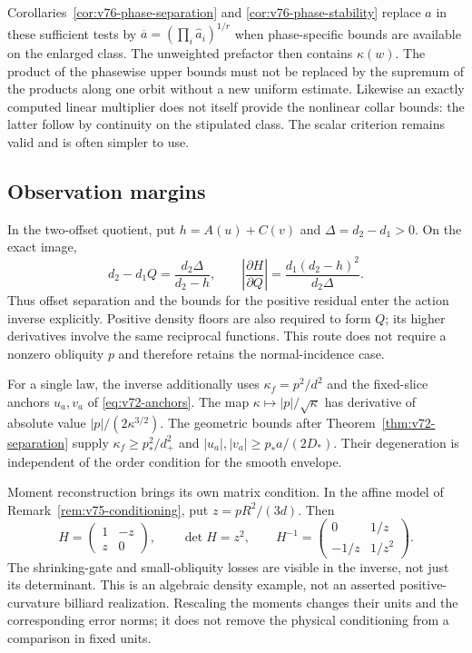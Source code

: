 Corollaries~\ref{cor:v76-phase-separation} and
\ref{cor:v76-phase-stability} replace $a$ in these sufficient tests by
$\overline a=(\prod_i\widehat a_i)^{1/r}$ when phase-specific bounds
are available on the enlarged class.  The unweighted prefactor then
contains $\kappa(w)$.  The product of the phasewise upper bounds must
not be replaced by the supremum of the products along one orbit without
a new uniform estimate.  Likewise an exactly computed linear multiplier
does not itself provide the nonlinear collar bounds: the latter follow
by continuity on the stipulated class.  The scalar criterion remains
valid and is often simpler to use.

\subsection{Observation margins}

In the two-offset quotient, put $h=A(u)+C(v)$ and
$\Delta=d_2-d_1>0$.  On the exact image,
\[
 d_2-d_1Q=\frac{d_2\Delta}{d_2-h},\qquad
 \left|\frac{\partial H}{\partial Q}\right|
        =\frac{d_1(d_2-h)^2}{d_2\Delta}.
\]
Thus offset separation and the bounds for the positive residual enter
the action inverse explicitly.  Positive density floors are also
required to form $Q$; its higher derivatives involve the same reciprocal
functions.  This route does not require a nonzero obliquity $p$ and
therefore retains the normal-incidence case.

For a single law, the inverse additionally uses
$\kappa_f=p^2/d^2$ and the fixed-slice anchors $u_a,v_a$ of
\eqref{eq:v72-anchors}.  The map $\kappa\mapsto|p|/\sqrt\kappa$
has derivative of absolute value $|p|/(2\kappa^{3/2})$.
The geometric bounds after Theorem~\ref{thm:v72-separation} supply
$\kappa_f\ge p_*^2/d_+^2$ and
$|u_a|,|v_a|\ge p_*a/(2D_*)$.  Their degeneration is independent
of the order condition for the smooth envelope.

Moment reconstruction brings its own matrix condition.  In the affine
model of Remark~\ref{rem:v75-conditioning}, put
$z=pR^2/(3d)$.  Then
\[
 H=\begin{pmatrix}1&-z\\z&0\end{pmatrix},\qquad
 \det H=z^2,\qquad
 H^{-1}=\begin{pmatrix}0&1/z\\-1/z&1/z^2\end{pmatrix}.
\]
The shrinking-gate and small-obliquity losses are visible in the inverse,
not just its determinant.  This is an algebraic density example, not an
asserted positive-curvature billiard realization.  Rescaling the moments
changes their units and the corresponding error norms; it does not
remove the physical conditioning from a comparison in fixed units.

